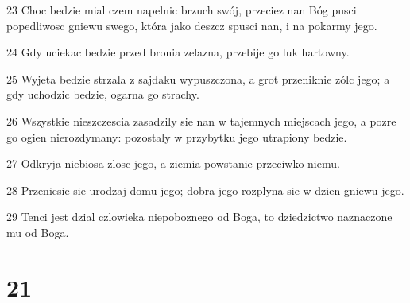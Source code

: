 \par 23 Choc bedzie mial czem napelnic brzuch swój, przeciez nan Bóg pusci popedliwosc gniewu swego, która jako deszcz spusci nan, i na pokarmy jego.
\par 24 Gdy uciekac bedzie przed bronia zelazna, przebije go luk hartowny.
\par 25 Wyjeta bedzie strzala z sajdaku wypuszczona, a grot przeniknie zólc jego; a gdy uchodzic bedzie, ogarna go strachy.
\par 26 Wszystkie nieszczescia zasadzily sie nan w tajemnych miejscach jego, a pozre go ogien nierozdymany: pozostaly w przybytku jego utrapiony bedzie.
\par 27 Odkryja niebiosa zlosc jego, a ziemia powstanie przeciwko niemu.
\par 28 Przeniesie sie urodzaj domu jego; dobra jego rozplyna sie w dzien gniewu jego.
\par 29 Tenci jest dzial czlowieka niepoboznego od Boga, to dziedzictwo naznaczone mu od Boga.

\chapter{21}

